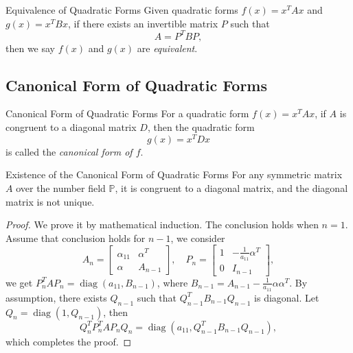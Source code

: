 \begin{definition}{Equivalence of Quadratic Forms}{}
  Given quadratic forms $f(x) = x^TAx$ and $g(x) = x^TBx$,
  if there exists an invertible matrix $P$ such that
  \begin{equation}
    A = P^T B P,
  \end{equation}
  then we say $f(x)$ and $g(x)$ are \emph{equivalent}.
\end{definition}

\subsection{Canonical Form of Quadratic Forms}

\begin{definition}{Canonical Form of Quadratic Forms}{}
  For a quadratic form $f(x) = x^TAx$,
  if $A$ is congruent to a diagonal matrix $D$,
  then the quadratic form
  \begin{equation}
    g(x) = x^T Dx
  \end{equation}
  is called the \emph{canonical form of $f$}.
\end{definition}

\begin{theorem}{Existence of the Canonical Form of Quadratic Forms}{}
  For any symmetric matrix $A$ over the number field $\mathbb{P}$,
  it is congruent to a diagonal matrix,
  and the diagonal matrix is not unique.
\end{theorem}

\begin{proof}
  We prove it by mathematical induction. The conclusion holds when $n = 1$.
  Assume that conclusion holds for $n - 1$, we consider
  \begin{equation}
    A_n =
    \begin{bmatrix}
      \alpha_{11} & \alpha^T\\
      \alpha & A_{n-1}
    \end{bmatrix},
    \quad
    P_n =
    \begin{bmatrix}
      1 & - \frac{1}{a_{11}}\alpha^T\\
      0 & I_{n-1}
    \end{bmatrix},
  \end{equation}
  we get $P_n^TAP_n = \operatorname{diag} (a_{11}, B_{n-1})$,
  where $B_{n-1} = A_{n-1} - \frac{1}{a_{11}}\alpha \alpha^T$.
  By assumption, there exists $Q_{n-1}$ such that $Q_{n-1}^TB_{n-1}Q_{n-1}$ is
  diagonal.
  Let $Q_n = \operatorname{diag}(1, Q_{n-1})$, then
  \begin{equation}
    Q_n^T P_n^T A P_n Q_n = \operatorname{diag}(a_{11}, Q_{n-1}^T B_{n-1}Q_{n-1}),
  \end{equation}
  which completes the proof.
\end{proof}


